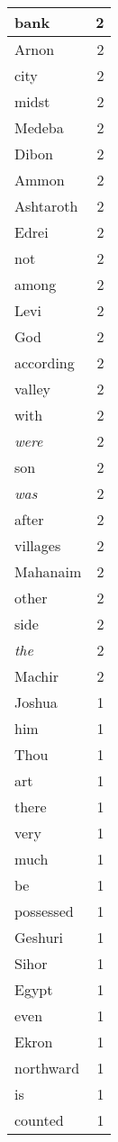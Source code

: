 \begin{center}
\begin{longtable}{l|r}
bank & 2\\ \hline 
Arnon & 2\\ \hline 
city & 2\\ \hline 
midst & 2\\ \hline 
Medeba & 2\\ \hline 
Dibon & 2\\ \hline 
Ammon & 2\\ \hline 
Ashtaroth & 2\\ \hline 
Edrei & 2\\ \hline 
not & 2\\ \hline 
among & 2\\ \hline 
Levi & 2\\ \hline 
God & 2\\ \hline 
according & 2\\ \hline 
valley & 2\\ \hline 
with & 2\\ \hline 
\emph{were} & 2\\ \hline 
son & 2\\ \hline 
\emph{was} & 2\\ \hline 
after & 2\\ \hline 
villages & 2\\ \hline 
Mahanaim & 2\\ \hline 
other & 2\\ \hline 
side & 2\\ \hline 
\emph{the} & 2\\ \hline 
Machir & 2\\ \hline 
Joshua & 1\\ \hline 
him & 1\\ \hline 
Thou & 1\\ \hline 
art & 1\\ \hline 
there & 1\\ \hline 
very & 1\\ \hline 
much & 1\\ \hline 
be & 1\\ \hline 
possessed & 1\\ \hline 
Geshuri & 1\\ \hline 
Sihor & 1\\ \hline 
Egypt & 1\\ \hline 
even & 1\\ \hline 
Ekron & 1\\ \hline 
northward & 1\\ \hline 
is & 1\\ \hline 
counted & 1\\ \hline 

\end{longtable}
\end{center}
